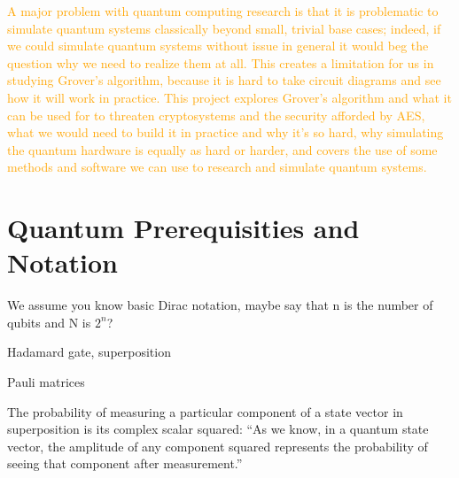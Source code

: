 
\textcolor{orange}{A major problem with quantum computing research is that it is problematic to simulate quantum systems classically beyond small, trivial base cases; indeed, if we could simulate quantum systems without issue in general it would beg the question why we need to realize them at all. This creates a limitation for us in studying Grover's algorithm, because it is hard to take circuit diagrams and see how it will work in practice. This project explores Grover's algorithm and what it can be used for to threaten cryptosystems and the security afforded by AES, what we would need to build it in practice and why it's so hard, why simulating the quantum hardware is equally as hard or harder, and covers the use of some methods and software we can use to research and simulate quantum systems.}



\section{Quantum Prerequisities and Notation}
We assume you know basic Dirac notation, maybe say that n is the number of qubits and N is $2^n$?

Hadamard gate, superposition

Pauli matrices

The probability of measuring a particular component of a state vector in superposition is its complex scalar squared: ``As we know, in a quantum state vector, the amplitude of any component squared represents the probability of seeing that component after measurement.''